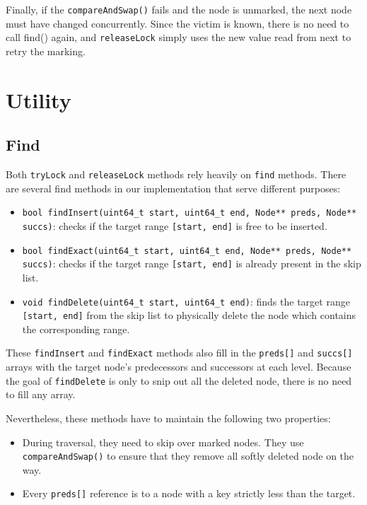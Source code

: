 Finally, if the \texttt{compareAndSwap()} fails and the node is unmarked, the next node must have changed concurrently. 
Since the victim is known, there is no need to call find() again, and \texttt{releaseLock} simply uses the new value read from next to retry the marking.

\newpage

\section{Utility}

\subsection{Find}\label{subsec:find}

Both \texttt{tryLock} and \texttt{releaseLock} methods rely heavily on \texttt{find} methods.
There are several find methods in our implementation that serve different purposes:

\begin{itemize}
    \item \texttt{bool findInsert(uint64\_t start, uint64\_t end, Node** preds, Node** succs)}: checks if the target range \texttt{[start, end]} is free to be inserted.
    
    \item \texttt{bool findExact(uint64\_t start, uint64\_t end, Node** preds, Node** succs)}: checks if the target range \texttt{[start, end]} is already present in the skip list.
    
    \item \texttt{void findDelete(uint64\_t start, uint64\_t end)}: finds the target range \texttt{[start, end]} from the skip list to physically delete the node which contains the corresponding range.
\end{itemize}

These \texttt{findInsert} and \texttt{findExact} methods also fill in the \texttt{preds[]} and \texttt{succs[]} arrays with the target node's predecessors and successors at each level.
Because the goal of \texttt{findDelete} is only to snip out all the deleted node, there is no need to fill any array.

Nevertheless, these methods have to maintain the following two properties:

\begin{itemize}
    \item During traversal, they need to skip over marked nodes.
    They use \texttt{compareAndSwap()} to ensure that they remove all softly deleted node on the way.
    \item Every \texttt{preds[]} reference is to a node with a key strictly less than the target.
\end{itemize}

